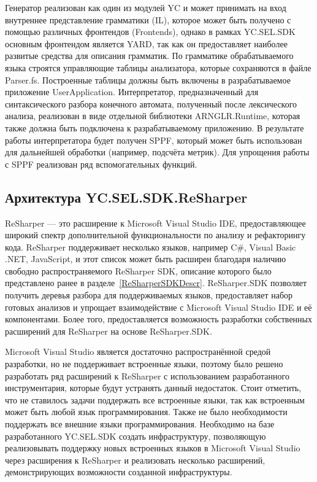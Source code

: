Генератор реализован как один из модулей YC и может принимать на вход внутреннее представление грамматики (IL), которое может быть получено с помощью различных фронтендов (Frontends), однако в рамках YC.SEL.SDK 
основным фронтендом является YARD, так как он предоставляет наиболее развитые средства для описания грамматик. По грамматике обрабатываемого языка строятся управляющие таблицы анализатора, которые сохраняются в файле Parser.fs. 
Построенные таблицы должны быть включены в разрабатываемое приложение UserApplication. Интерпретатор, предназначенный для синтаксического разбора конечного автомата, полученный после лексического анализа, реализован 
в виде отдельной библиотеки ARNGLR.Runtime, которая также должна быть подключена к разрабатываемому приложению. В результате работы интерпретатора будет получен SPPF, который может быть использован для дальнейшей 
обработки (например, подсчёта метрик). Для упрощения работы с SPPF реализован ряд вспомогательных функций.

\subsection{Архитектура YC.SEL.SDK.ReSharper}

ReSharper --- это расширение к Microsoft Visual Studio IDE, предоставляющее широкий спектр  дополнительной функциональности по анализу и рефакторингу кода. ReSharper поддерживает несколько языков, например C\#, Visual Basic .NET, JavaScript, и этот список может быть расширен благодаря наличию свободно распространяемого ReSharper SDK, описание которого было представлено ранее в разделе~\ref{ReSharperSDKDescr}. ReSharper.SDK позволяет получить деревья разбора для поддерживаемых языков, предоставляет набор готовых анализов и упрощает взаимодействие с Microsoft Visual Studio IDE и её компонентами. Более того, предоставляется возможность разработки собственных расширений для ReSharper на основе ReSharper.SDK.

Microsoft Visual Studio является достаточно распространённой средой разработки, но не поддерживает встроенные языки, поэтому было решено разработать ряд расширений к ReSharper с использованием разработанного инструментария, которые будут устранять данный недостаток. Стоит отметить, что не ставилось задачи поддержать все встроенные языки, так как встроенным может быть любой язык программирования. Также не было необходимости поддержать все внешние языки программирования. Необходимо на базе разработанного YC.SEL.SDK создать инфраструктуру, позволяющую реализовывать поддержку новых встроенных языков в Microsoft Visual Studio через расширения к ReSharper и реализовать несколько расширений, демонстрирующих возможности созданной инфраструктуры. 

